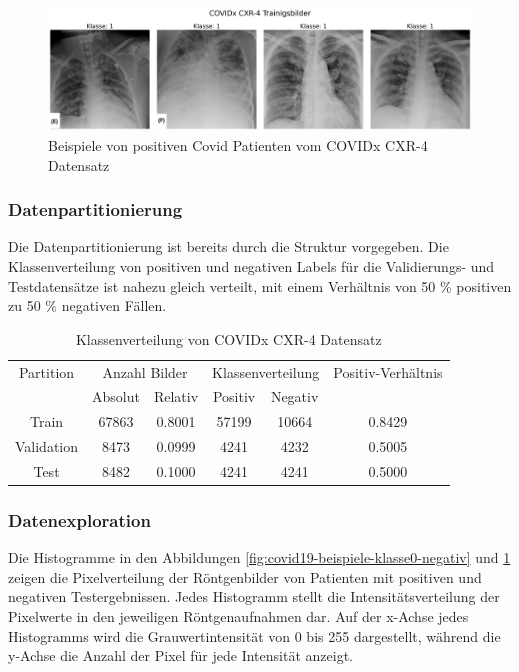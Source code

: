 \begin{figure}[H]
    \centering
    \includegraphics[width=\linewidth]{01-images/03-data/covid19-klasse1.png}
    \caption{Beispiele von positiven Covid Patienten vom COVIDx CXR-4 Datensatz}
    \label{fig:covid19-beispiele-klasse1-positiv}
\end{figure}

\subsubsection{Datenpartitionierung} \label{chap:COVID19-Partition}
Die Datenpartitionierung ist bereits durch die Struktur vorgegeben. Die Klassenverteilung von positiven und negativen Labels für die Validierungs- und Testdatensätze ist nahezu gleich verteilt, mit einem Verhältnis von 50 \% positiven zu 50 \% negativen Fällen.

\begin{table}[h]
    \centering
    \begin{tabular}{@{}cccccc@{}}
        \toprule
        Partition & \multicolumn{2}{c}{Anzahl Bilder} & \multicolumn{2}{c}{Klassenverteilung} & Positiv-Verhältnis\\ 
        \cmidrule(lr){2-3} \cmidrule(lr){4-5} 
                  & Absolut & Relativ & Positiv & Negativ & \\ 
        \midrule
        Train      & 67863 & 0.8001 & 57199 & 10664 & 0.8429 \\
        Validation & 8473  & 0.0999 & 4241  & 4232  & 0.5005 \\
        Test       & 8482  & 0.1000 & 4241  & 4241  & 0.5000 \\ 
        \bottomrule
    \end{tabular}
    \caption{Klassenverteilung von COVIDx CXR-4 Datensatz}
    \label{tab:covid19-klassenverteilung}
\end{table}

\subsubsection{Datenexploration} \label{chap:COVID19-eda}
Die Histogramme in den Abbildungen \ref{fig:covid19-beispiele-klasse0-negativ} und \ref{fig:covid19-beispiele-klasse1-positiv} zeigen die Pixelverteilung der Röntgenbilder von Patienten mit positiven und negativen Testergebnissen. Jedes Histogramm stellt die Intensitätsverteilung der Pixelwerte in den jeweiligen Röntgenaufnahmen dar. Auf der x-Achse jedes Histogramms wird die Grauwertintensität von 0 bis 255 dargestellt, während die y-Achse die Anzahl der Pixel für jede Intensität anzeigt.

